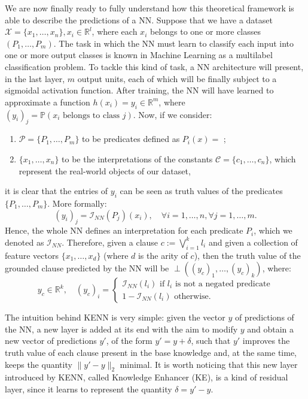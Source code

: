 We are now finally ready to fully understand how this theoretical framework is able to describe the predictions of a NN. Suppose that we have a dataset $\mathcal{X}=\{x_1, \dots, x_n\}, x_i\in\mathbb{R}^l$, where each $x_i$ belongs to one or more classes $\left( P_1, \dots, P_m \right)$. The task in which the NN must learn to classify each input into one or more output classes is known  in Machine Learning as a multilabel classification problem. To tackle this kind of task, a NN architecture will present, in the last layer, $m$ output units, each of which will be finally subject to a sigmoidal activation function. After training, the NN will have learned to approximate a function $h(x_i) = y_i \in \mathbb{R}^m$, where $(y_i)_j = \mathbb{P}(x_i\text{ belongs to class }j).$ Now, if we consider:
\begin{enumerate}
	\item $\mathcal{P} = \{P_1,\dots,P_m\}$ to be predicates defined as $P_i(x) = $ ;
	\item $\{x_1,\dots, x_n\}$ to be the interpretations of the constants $\mathcal{C} = \{c_1,\dots,c_n\}$, which represent the real-world objects of our dataset,
\end{enumerate}  it is clear that the entries of $y_i$ can be seen as truth values of the predicates $\{P_1,\dots,P_m\}$. More formally:
\begin{equation}
(y_i)_j = \mathcal{I}_{NN}(P_j)(x_i), \quad \forall i=1,\dots,n, \forall j=1,\dots,m.
\end{equation}
Hence, the whole NN defines an interpretation for each predicate $P_i$, which we denoted as $\mathcal{I}_{NN}$. Therefore, given a clause $c := \bigvee_{i=1}^k l_i$ and given a collection of feature vectors $\{x_1,\dots,x_d\}$  (where $d$ is the arity of $c$), then the truth value of the grounded clause predicted by the NN will be $\perp((y_c)_1,\dots,(y_c)_k)$, where:
\begin{equation}
y_c \in \mathbb{R}^k, \quad(y_c)_i = \begin{cases}
\mathcal{I}_{NN}(l_i) \text{ if } l_i \text{ is not a negated predicate}\\
1-\mathcal{I}_{NN}(l_i) \text{ otherwise.}
\end{cases}
\end{equation}

The intuition behind KENN is very simple: given the vector $y$ of predictions of the NN, a new layer is added at its end with the aim to modify $y$ and obtain a new vector of predictions $y'$, of the form $y'=y+\delta$, such that $y'$ improves the truth value of each clause present in the base knowledge and, at the same time, keeps the quantity $\|y'-y\|_2$ minimal. It is worth noticing that this new layer introduced by KENN, called Knowledge Enhancer (KE), is a kind of residual layer, since it learns to represent the quantity $\delta = y'-y$.

